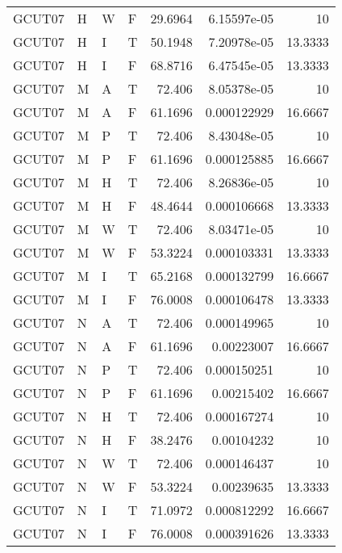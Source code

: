 \begin{table}[htb!]
{\begin{tabular}{llllrrr}
            GCUT07   & H     & W     & F          & 29.6964    & 6.15597e-05 & 10       \\
            GCUT07   & H     & I     & T          & 50.1948    & 7.20978e-05 & 13.3333  \\
            GCUT07   & H     & I     & F          & 68.8716    & 6.47545e-05 & 13.3333  \\
            GCUT07   & M     & A     & T          & 72.406     & 8.05378e-05 & 10       \\
            GCUT07   & M     & A     & F          & 61.1696    & 0.000122929 & 16.6667  \\
            GCUT07   & M     & P     & T          & 72.406     & 8.43048e-05 & 10       \\
            GCUT07   & M     & P     & F          & 61.1696    & 0.000125885 & 16.6667  \\
            GCUT07   & M     & H     & T          & 72.406     & 8.26836e-05 & 10       \\
            GCUT07   & M     & H     & F          & 48.4644    & 0.000106668 & 13.3333  \\
            GCUT07   & M     & W     & T          & 72.406     & 8.03471e-05 & 10       \\
            GCUT07   & M     & W     & F          & 53.3224    & 0.000103331 & 13.3333  \\
            GCUT07   & M     & I     & T          & 65.2168    & 0.000132799 & 16.6667  \\
            GCUT07   & M     & I     & F          & 76.0008    & 0.000106478 & 13.3333  \\
            GCUT07   & N     & A     & T          & 72.406     & 0.000149965 & 10       \\
            GCUT07   & N     & A     & F          & 61.1696    & 0.00223007  & 16.6667  \\
            GCUT07   & N     & P     & T          & 72.406     & 0.000150251 & 10       \\
            GCUT07   & N     & P     & F          & 61.1696    & 0.00215402  & 16.6667  \\
            GCUT07   & N     & H     & T          & 72.406     & 0.000167274 & 10       \\
            GCUT07   & N     & H     & F          & 38.2476    & 0.00104232  & 10       \\
            GCUT07   & N     & W     & T          & 72.406     & 0.000146437 & 10       \\
            GCUT07   & N     & W     & F          & 53.3224    & 0.00239635  & 13.3333  \\
            GCUT07   & N     & I     & T          & 71.0972    & 0.000812292 & 16.6667  \\
            GCUT07   & N     & I     & F          & 76.0008    & 0.000391626 & 13.3333  \\
            \hline
        \end{tabular}
    }{
    }
\end{table} 
